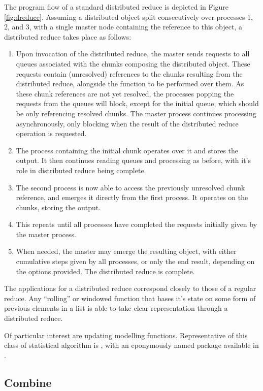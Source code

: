 The program flow of a standard distributed reduce is depicted in Figure \cref{fig:dreduce}.
Assuming a distributed object split consecutively over processes 1, 2, and 3, with a single master node containing the reference to this object, a distributed reduce takes place as follows:
\begin{enumerate}
	\item Upon invocation of the distributed reduce, the master sends requests to all queues associated with the chunks composing the distributed object. These requests contain (unresolved) references to the chunks resulting from the distributed reduce, alongside the function to be performed over them. As these chunk references are not yet resolved, the processes popping the requests from the queues will block, except for the initial queue, which should be only referencing resolved chunks. The master process continues processing asynchronously, only blocking when the result of the distributed reduce operation is requested.
	\item The process containing the initial chunk operates over it and stores the output. It then continues reading queues and processing as before, with it's role in distributed reduce being complete.
	\item The second process is now able to access the previously unresolved chunk reference, and emerges it directly from the first process. It operates on the chunks, storing the output.
	\item This repeats until all processes have completed the requests initially given by the master process.
	\item When needed, the master may emerge the resulting object, with either cumulative steps given by all processes, or only the end result, depending on the options provided. The distributed reduce is complete.
\end{enumerate}

The applications for a distributed reduce correspond closely to those of a regular reduce.
Any ``rolling'' or windowed function that bases it's state on some form of previous elements in a list is able to take clear representation through a distributed reduce.

Of particular interest are updating modelling functions.
Representative of this class of statistical algorithm is , with an eponymously named package available in \R.

\subsection{Combine}\label{sec:combine}

